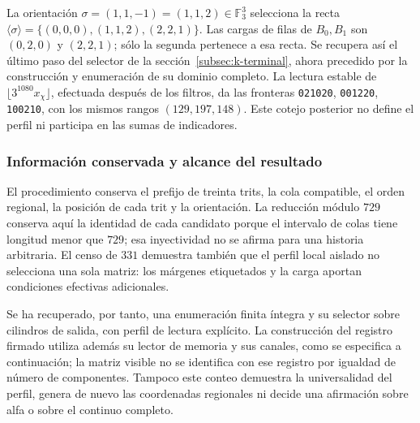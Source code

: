 La orientación \(\sigma=(1,1,-1)=(1,1,2)\in\mathbb F_3^3\)
selecciona la recta
\(\langle\sigma\rangle=\{(0,0,0),(1,1,2),(2,2,1)\}\).
Las cargas de filas de \(B_0,B_1\) son \((0,2,0)\) y \((2,2,1)\);
sólo la segunda pertenece a esa recta. Se recupera así el último paso
del selector de la sección~\ref{subsec:k-terminal}, ahora precedido por
la construcción y enumeración de su dominio completo. La lectura estable
de \(\lfloor3^{1080}x_\chi\rfloor\), efectuada después de los filtros,
da las fronteras \texttt{021020}, \texttt{001220}, \texttt{100210},
con los mismos rangos \((129,197,148)\). Este cotejo posterior no define
el perfil ni participa en las sumas de indicadores.

\subsubsection{Información conservada y alcance del resultado}

El procedimiento conserva el prefijo de treinta trits, la cola compatible,
el orden regional, la posición de cada trit y la orientación. La reducción
módulo \(729\) conserva aquí la identidad de cada candidato porque el
intervalo de colas tiene longitud menor que \(729\); esa inyectividad
no se afirma para una historia arbitraria. El censo de \(331\) demuestra
también que el perfil local aislado no selecciona una sola matriz: los
márgenes etiquetados y la carga aportan condiciones efectivas adicionales.

Se ha recuperado, por tanto, una enumeración finita íntegra y su selector
sobre cilindros de salida, con perfil de lectura explícito. La construcción
del registro firmado utiliza además su lector de memoria y sus canales,
como se especifica a continuación; la matriz visible no se identifica con
ese registro por igualdad de número de componentes. Tampoco este conteo
demuestra la universalidad del perfil, genera de nuevo las coordenadas
regionales ni decide una afirmación sobre alfa o sobre el continuo completo.
